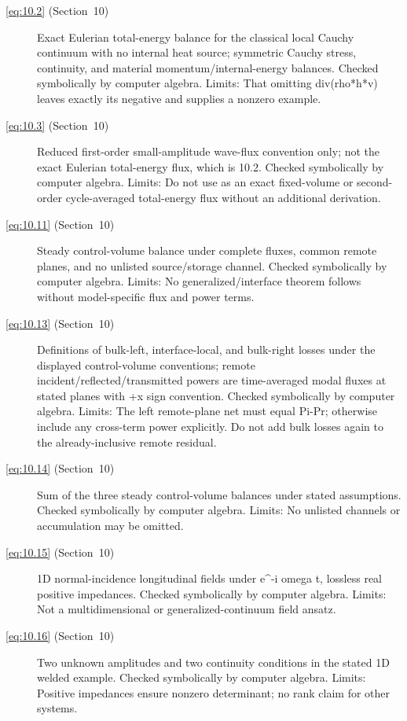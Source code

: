 \begin{description}
  \item[\eqref{eq:10.2} (Section~10)] Exact Eulerian total-energy balance for the classical local Cauchy continuum with no internal heat source; symmetric Cauchy stress, continuity, and material momentum/internal-energy balances. Checked symbolically by computer algebra. Limits: That omitting div(rho*h*v) leaves exactly its negative and supplies a nonzero example.

  \item[\eqref{eq:10.3} (Section~10)] Reduced first-order small-amplitude wave-flux convention only; not the exact Eulerian total-energy flux, which is 10.2. Checked symbolically by computer algebra. Limits: Do not use as an exact fixed-volume or second-order cycle-averaged total-energy flux without an additional derivation.

  \item[\eqref{eq:10.11} (Section~10)] Steady control-volume balance under complete fluxes, common remote planes, and no unlisted source/storage channel. Checked symbolically by computer algebra. Limits: No generalized/interface theorem follows without model-specific flux and power terms.

  \item[\eqref{eq:10.13} (Section~10)] Definitions of bulk-left, interface-local, and bulk-right losses under the displayed control-volume conventions; remote incident/reflected/transmitted powers are time-averaged modal fluxes at stated planes with +x sign convention. Checked symbolically by computer algebra. Limits: The left remote-plane net must equal Pi-Pr; otherwise include any cross-term power explicitly. Do not add bulk losses again to the already-inclusive remote residual.

  \item[\eqref{eq:10.14} (Section~10)] Sum of the three steady control-volume balances under stated assumptions. Checked symbolically by computer algebra. Limits: No unlisted channels or accumulation may be omitted.

  \item[\eqref{eq:10.15} (Section~10)] 1D normal-incidence longitudinal fields under e^{-i omega t}, lossless real positive impedances. Checked symbolically by computer algebra. Limits: Not a multidimensional or generalized-continuum field ansatz.

  \item[\eqref{eq:10.16} (Section~10)] Two unknown amplitudes and two continuity conditions in the stated 1D welded example. Checked symbolically by computer algebra. Limits: Positive impedances ensure nonzero determinant; no rank claim for other systems.


\end{description}
